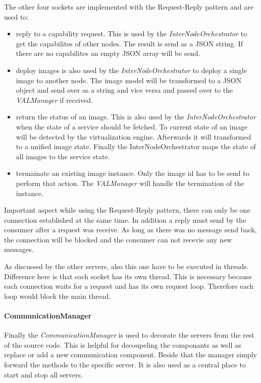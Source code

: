 The other four sockets are implemented with the Request-Reply pattern and are used to:
\begin{itemize}
  \item reply to a capability request.
  This is used by the \textit{InterNodeOrchestrator} to get the capabilites of other nodes.
  The result is send as a \ac{JSON} string.
  If there are no capabilites an empty \ac{JSON} array will be send.
  \item deploy images is also used by the \textit{InterNodeOrchestrator} to deploy a single image to another node.
  The image model will be transformed to a \ac{JSON} object and send over as a string and vice versa and passed over to the \textit{VALManager} if received.
  \item return the status of an image. This is also used by the \textit{InterNodeOrchestrator} when the state of a service should be fetched. To current state of an image will be detected by the virtualization engine. Afterwards it will transformed to a unified image state. Finally the InterNodeOrchestrator maps the state of all images to the service state.
  \item termainate an existing image instance.
  Only the image id has to be send to perform that action.
  The \textit{VALManager} will handle the termination of the instance.
\end{itemize}
Important aspect while using the Request-Reply pattern, there can only be one connection established at the same time.
In addition a reply must send by the consumer after a request was receive.
As long as there was no message send back, the connection will be blocked and the consumer can not recevie any new messages.

As discussed by the other servers, also this one have to be executed in threads.
Difference here is that each socket has its own thread.
This is necessary because each connection waits for a request and has its own request loop.
Therefore each loop would block the main thread.

\paragraph{CommunicationManager}
Finally the \textit{CommunicationManager} is used to decorate the servers from the rest of the source code.
This is helpful for decoupeling the componants as well as replace or add a new communication component.
Beside that the manager simply forward the methods to the specific server.
It is also used as a central place to start and stop all servers.


